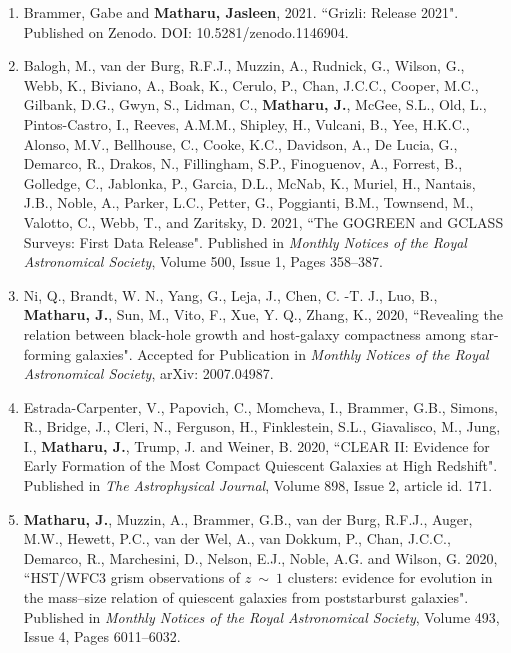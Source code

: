 \documentclass[11pt]{article}
\makeatletter
\newlength{\bibhang}
\newlength{\bibsep}
 {\@listi \global\bibsep\itemsep \global\advance\bibsep by\parsep}
\newenvironment{bibsection}%
        {\begin{enumerate}{}{%
       \setlength{\leftmargin}{\bibhang}%
       \setlength{\itemindent}{-\leftmargin}%
       \setlength{\itemsep}{\bibsep}%
       \setlength{\parsep}{\z@}%
        \setlength{\partopsep}{0pt}%
        \setlength{\topsep}{0pt}}}
        {\end{enumerate}\vspace{-.6\baselineskip}}
\makeatother
\begin{document}
\begin{bibsection}
	
	\item Brammer, Gabe and {\bf Matharu, Jasleen}, 2021. ``Grizli: Release 2021". Published on Zenodo. DOI: 10.5281/zenodo.1146904.
	
	\item Balogh, M., van der Burg, R.F.J., Muzzin, A., Rudnick, G., Wilson, G., Webb, K., Biviano, A., Boak, K., Cerulo, P.,  Chan, J.C.C., Cooper, M.C., Gilbank, D.G., Gwyn, S., Lidman, C., {\bf Matharu, J.}, McGee, S.L., Old, L., Pintos-Castro, I.,  Reeves, A.M.M., Shipley, H., Vulcani, B., Yee, H.K.C., Alonso, M.V., Bellhouse, C., Cooke, K.C., Davidson, A., De Lucia, G., Demarco, R., Drakos, N., Fillingham, S.P., Finoguenov, A., Forrest, B., Golledge, C., Jablonka, P., Garcia, D.L., McNab, K., Muriel, H., Nantais, J.B., Noble, A., Parker, L.C., Petter, G., Poggianti, B.M., Townsend, M., Valotto, C., Webb, T., and Zaritsky, D. 2021, ``The GOGREEN and GCLASS Surveys: First Data Release". Published in \emph{Monthly Notices of the Royal Astronomical Society}, Volume 500, Issue 1, Pages 358--387.
	
	\item Ni, Q., Brandt, W. N., Yang, G., Leja, J., Chen, C. -T. J., Luo, B., {\bf Matharu, J.}, Sun, M., Vito, F., Xue, Y. Q., Zhang, K., 2020, ``Revealing the relation between black-hole growth and host-galaxy compactness among star-forming galaxies". Accepted for Publication in \emph{Monthly Notices of the Royal Astronomical Society}, arXiv: 2007.04987.
	
	\item Estrada-Carpenter, V., Papovich, C., Momcheva, I., Brammer, G.B., Simons, R., Bridge, J., Cleri, N., Ferguson, H., Finklestein, S.L., Giavalisco, M., Jung, I., {\bf Matharu, J.}, Trump, J. and Weiner, B. 2020, ``CLEAR II: Evidence for Early Formation of the Most Compact Quiescent Galaxies at High Redshift". Published in \emph{The Astrophysical Journal}, Volume 898, Issue 2, article id. 171.
	
	 \item {\bf Matharu, J.}, Muzzin, A., Brammer, G.B., van der Burg, R.F.J., Auger, M.W., Hewett, P.C., van der Wel, A., van Dokkum, P., Chan, J.C.C., Demarco, R., Marchesini, D., Nelson, E.J., Noble, A.G. and Wilson, G.  2020, ``HST/WFC3 grism observations of $z~\mathtt{\sim}~1$ clusters: evidence for evolution in the mass--size relation of quiescent galaxies from poststarburst galaxies". Published in \emph{Monthly Notices of the Royal Astronomical Society}, Volume 493, Issue 4, Pages 6011--6032.
	    

\end{bibsection}
\end{document}
